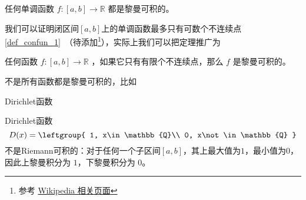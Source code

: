 \begin{theorem}{}
任何单调函数 $f: [a, b] \to \mathbb{R}$ 都是黎曼可积的。
\end{theorem}

我们可以证明闭区间$[a, b]$上的单调函数最多只有可数个不连续点\autoref{def_confun_1}~（待添加\footnote{参考 \href{https://en.wikipedia.org/wiki/Discontinuities_of_monotone_functions}{Wikipedia 相关页面}}），实际上我们可以把定理推广为

\begin{theorem}{}
任何函数 $f: [a, b] \to \mathbb{R}$ ，如果它只有有限个不连续点，那么 $f$ 是黎曼可积的。
\end{theorem}





不是所有函数都是黎曼可积的，比如

\begin{example}{Dirichlet函数}

Dirichlet函数
\begin{equation}
D(x)=
\leftgroup{
    1, x\in\mathbb{Q}\\
    0, x\not\in\mathbb{Q}
}
\end{equation}
不是Riemann可积的：对于任何一个子区间$[a, b]$，其上最大值为$1$，最小值为$0$，因此上黎曼积分为 $1$，下黎曼积分为 $0$。
\end{example}
